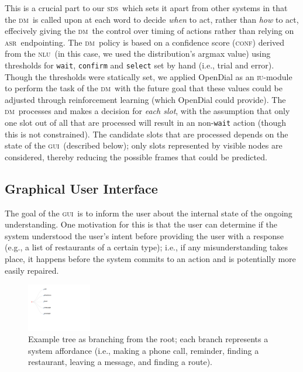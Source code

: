\documentclass[11pt]{article}
\newcommand{\sds}[0]{\textsc{sds}}
\newcommand{\nlu}[0]{\textsc{nlu}}
\newcommand{\asr}[0]{\textsc{asr}}
\newcommand{\dm}[0]{\textsc{dm}}
\newcommand{\ui}[0]{\textsc{gui}}
\newcommand{\iu}[0]{\textsc{iu}}
\newcommand{\conf}[0]{\textsc{conf}}
\begin{document}
This is a crucial part to our \sds\ which sets it apart from other systems in that the \dm\ is called upon at each word to decide \emph{when} to act, rather than \emph{how} to act, effecively giving the \dm\ the control over timing of actions rather than relying on \asr\ endpointing. The \dm\ policy is based on a confidence score (\conf) derived from the \nlu\ (in this case, we used the distribution's argmax value) using thresholds for \texttt{wait}, \texttt{confirm} and \texttt{select} set by hand (i.e., trial and error). Though the thresholds were statically set, we applied OpenDial \cite{Lison2015a} as an \iu-module to perform the task of the \dm\ with the future goal that these values could be adjusted through reinforcement learning (which OpenDial could provide). The \dm\ processes and makes a decision for \emph{each slot}, with the assumption that only one slot out of all that are processed will result in an non-\texttt{wait} action (though this is not constrained). The candidate slots that are processed depends on the state of the \ui\ (described below); only slots represented by visible nodes are considered, thereby reducing the possible frames that could be predicted.

\subsection{Graphical User Interface}
\label{section:display}

The goal of the \ui\ is to inform the user about the internal state of the ongoing understanding. One motivation for this is that the user can determine if the system understood the user's intent before providing the user with a response (e.g., a list of restaurants of a certain type); i.e., if any misunderstanding takes place, it happens before the system commits to an action and is potentially more easily repaired. 

\begin{figure}
  \centering
      \includegraphics[width=0.25\textwidth]{figures/diatree-affordances.pdf}	
      \caption{Example tree as branching from the root; each branch represents a system affordance (i.e., making a phone call, reminder, finding a restaurant, leaving a message, and finding a route). \label{fig:afforances}}
\end{figure}
\end{document}
